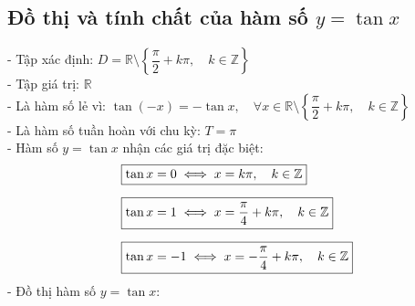\subsection{Đồ thị và tính chất của hàm số $y = \tan x$}
\noindent
\hspace*{1cm}
- Tập xác định: $D = \mathbb{R} \setminus \left\{\dfrac{\pi}{2} + k\pi, \quad k \in \mathbb{Z}\right\}$\\[6pt]
\hspace*{1cm}
- Tập giá trị: $\mathbb{R}$\\[6pt]
\hspace*{1cm}
- Là hàm số lẻ vì: $\tan(-x) = -\tan x, \quad \forall x \in \mathbb{R} \setminus \left\{\dfrac{\pi}{2} + k\pi, \quad k \in \mathbb{Z}\right\}$\\[6pt]
\hspace*{1cm}
- Là hàm số tuần hoàn với chu kỳ: $T = \pi$\\[6pt]
\hspace*{1cm}
- Hàm số $y = \tan x$ nhận các giá trị đặc biệt:\\[6pt]
\[
    \begin{aligned}
        &\fbox{$\tan x = 0 \iff x = k\pi, \quad k \in \mathbb{Z}$}\\[6pt]
        &\fbox{$\tan x = 1 \iff x = \dfrac{\pi}{4} + k\pi, \quad k \in \mathbb{Z}$}\\[6pt]
        &\fbox{$\tan x = -1 \iff x = -\dfrac{\pi}{4} + k\pi, \quad k \in \mathbb{Z}$}
    \end{aligned}
\]
\hspace*{1cm}
- Đồ thị hàm số $y = \tan x$:\\
\begin{center}
    
\end{center}

